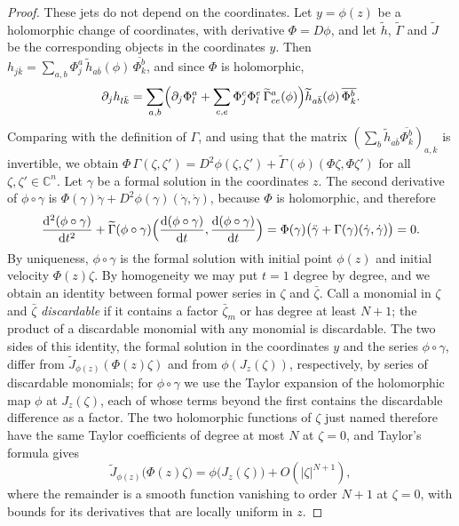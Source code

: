 \begin{proof}
These jets do not depend on the coordinates. Let $y=\phi(z)$ be a holomorphic change of coordinates, with derivative $\Phi=D\phi$, and let $\widetilde h$, $\widetilde\Gamma$ and $\widetilde J$ be the corresponding objects in the coordinates $y$. Then $h_{j\bar k}=\sum_{a,b}\Phi^a_j\,\widetilde h_{a\bar b}(\phi)\,\overline{\Phi^b_k}$, and since $\Phi$ is holomorphic,
\[
 \partial_jh_{l\bar k}=\sum_{a,b}\Bigl(\partial_j\Phi^a_l+\sum_{c,e}\Phi^c_j\Phi^e_l\,\widetilde\Gamma^a_{ce}(\phi)\Bigr)\widetilde h_{a\bar b}(\phi)\,\overline{\Phi^b_k}.
\]
Comparing with the definition of $\Gamma$, and using that the matrix $(\sum_b\widetilde h_{a\bar b}\overline{\Phi^b_k})_{a,k}$ is invertible, we obtain $\Phi\,\Gamma(\zeta,\zeta')=D^2\phi(\zeta,\zeta')+\widetilde\Gamma(\phi)(\Phi\zeta,\Phi\zeta')$ for all $\zeta,\zeta'\in\mathbb C^n$. Let $\gamma$ be a formal solution in the coordinates $z$. The second derivative of $\phi\circ\gamma$ is $\Phi(\gamma)\ddot\gamma+D^2\phi(\gamma)(\dot\gamma,\dot\gamma)$, because $\Phi$ is holomorphic, and therefore
\[
 \frac{\mathrm d^2(\phi\circ\gamma)}{\mathrm dt^2}+\widetilde\Gamma(\phi\circ\gamma)\Bigl(\frac{\mathrm d(\phi\circ\gamma)}{\mathrm dt},\frac{\mathrm d(\phi\circ\gamma)}{\mathrm dt}\Bigr)=\Phi(\gamma)\bigl(\ddot\gamma+\Gamma(\gamma)(\dot\gamma,\dot\gamma)\bigr)=0.
\]
By uniqueness, $\phi\circ\gamma$ is the formal solution with initial point $\phi(z)$ and initial velocity $\Phi(z)\zeta$. By homogeneity we may put $t=1$ degree by degree, and we obtain an identity between formal power series in $\zeta$ and $\bar\zeta$. Call a monomial in $\zeta$ and $\bar\zeta$ \emph{discardable} if it contains a factor $\bar\zeta_m$ or has degree at least $N+1$; the product of a discardable monomial with any monomial is discardable. The two sides of this identity, the formal solution in the coordinates $y$ and the series $\phi\circ\gamma$, differ from $\widetilde J_{\phi(z)}(\Phi(z)\zeta)$ and from $\phi(J_z(\zeta))$, respectively, by series of discardable monomials; for $\phi\circ\gamma$ we use the Taylor expansion of the holomorphic map $\phi$ at $J_z(\zeta)$, each of whose terms beyond the first contains the discardable difference as a factor. The two holomorphic functions of $\zeta$ just named therefore have the same Taylor coefficients of degree at most $N$ at $\zeta=0$, and Taylor's formula gives
\begin{equation}\label{eq:chern-jet-compatibility}
 \widetilde J_{\phi(z)}\bigl(\Phi(z)\zeta\bigr)=\phi\bigl(J_z(\zeta)\bigr)+O(|\zeta|^{N+1}),
\end{equation}
where the remainder is a smooth function vanishing to order $N+1$ at $\zeta=0$, with bounds for its derivatives that are locally uniform in $z$.


\end{proof}
